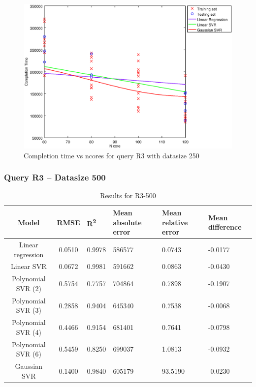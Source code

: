 \documentclass[a4paper,11pt]{article}
\begin{document}
\begin {figure}[hbtp]
\centering
\includegraphics[width=\textwidth]{output/R3_250_LINEAR_NCORE/plot_R3_250_bestmodels.eps}
\caption{Completion time vs ncores for query R3 with datasize 250}
\label{fig:all_linear_R3_250}
\end {figure}

\newpage
\subsubsection{Query R3 -- Datasize 500}
\begin{table}[H]
	\centering
	\begin{adjustbox}{center}
		\begin{tabular}{c | c M{1.2cm} M{2.5cm} M{2.5cm} M{1.8cm}}
			Model & RMSE & R\textsuperscript{2} & Mean absolute error & Mean relative error & Mean difference \tabularnewline
			\hline
			Linear regression & 0.0510 & 0.9978 & 586577 & 0.0743 & -0.0177 \\
			Linear SVR & 0.0672 & 0.9981 & 591662 & 0.0863 & -0.0430 \\
			Polynomial SVR (2) & 0.5754 & 0.7757 & 704864 & 0.7898 & -0.1907 \\
			Polynomial SVR (3) & 0.2858 & 0.9404 & 645340 & 0.7538 & -0.0068 \\
			Polynomial SVR (4) & 0.4466 & 0.9154 & 681401 & 0.7641 & -0.0798 \\
			Polynomial SVR (6) & 0.5459 & 0.8250 & 699037 & 1.0813 & -0.0932 \\
			Gaussian SVR & 0.1400 & 0.9840 & 605179 & 93.5190 & -0.0230 \\
		\end{tabular}
	\end{adjustbox}
	\\
	\caption{Results for R3-500}
	\label{fig:all_linear_R3_500}
\end{table}
\end{document}
